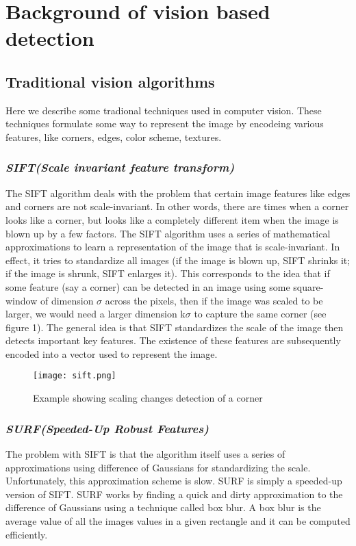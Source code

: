\chapter{Background of vision based detection}

	\section{Traditional vision algorithms}
	\label{sec:Traditional vision algorithms}
		Here we describe some tradional techniques used in computer vision. These techniques formulate some way to represent the image by encodeing various features, like corners, edges, color scheme, textures.~\cite{lee2015comparing}
		
	\subsection{\emph{SIFT(Scale invariant feature transform)}}
	
	The SIFT algorithm deals with the problem that certain image features like edges and corners are not scale-invariant. In other words, there are times when a corner looks like a corner, but looks like a completely different item when the image is blown up by a few factors. The SIFT algorithm uses a series of mathematical approximations to learn a representation of the image that is scale-invariant. In effect, it tries to standardize all images (if the image is blown up, SIFT shrinks it; if the
	image is shrunk, SIFT enlarges it). This corresponds to the
	idea that if some feature (say a corner) can be detected in an
	image using some square-window of dimension $\sigma$ across the
	pixels, then if the image was scaled to be larger, we
	would need a larger dimension k$\sigma$ to capture the same corner
	(see figure 1). The general idea is that SIFT standardizes the scale of the image then detects important key features. The existence of
	these features are subsequently encoded into a vector used to
	represent the image.
	\begin{figure}[htbp]
		\centering
		\texttt{[image: sift.png]}
		\caption{Example showing scaling changes detection of a corner\label{Example showing scaling changes detection of a corner}}
	\end{figure}
	
	\subsection{\emph{SURF(Speeded-Up Robust Features)}}
	The problem with SIFT is that the algorithm itself uses a
	series of approximations using difference of Gaussians for standardizing the scale. Unfortunately, this approximation
	scheme is slow. SURF is simply a speeded-up version of
	SIFT. SURF works by finding a quick and dirty approximation to the difference of Gaussians using a technique called
	box blur. A box blur is the average value of all the images
	values in a given rectangle and it can be computed efficiently.
	
